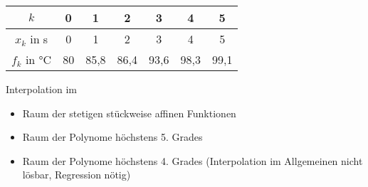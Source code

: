 \begin{example}
	\hspace*{1.5em}
	\begin{center}
		\begin{tabular}{c|cccccc}
			$k$ & 0 & 1 & 2 & 3 & 4 & 5 \\
			\hline
			$x_k$ in s & 0 & 1 & 2 & 3 & 4 & 5 \\
			\hline
			$f_k$ in °C & 80 & 85,8 & 86,4 & 93,6 & 98,3 & 99,1
		\end{tabular}
	\end{center}
Interpolation im
\begin{itemize}
	\item Raum der stetigen stückweise affinen Funktionen
	\item Raum der Polynome höchstens 5. Grades
	\item Raum der Polynome höchstens 4. Grades (Interpolation im Allgemeinen nicht lösbar, Regression nötig)
\end{itemize}
\end{example}

